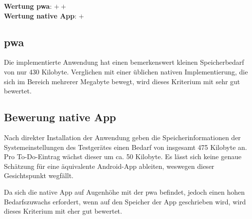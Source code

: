\textbf{Wertung \ac{pwa}}: $++$ \\
\textbf{Wertung native App}: $+$ \\

\subsection{\ac{pwa}}
Die implementierte Anwendung hat einen bemerkenswert kleinen Speicherbedarf von  nur 430 Kilobyte. Verglichen mit einer üblichen nativen Implementierung, die sich im Bereich mehrerer Megabyte bewegt, wird dieses Kriterium mit sehr gut bewertet.

\subsection{Bewerung native App}
Nach direkter Installation der Anwendung geben die Speicherinformationen der Systemeinstellungen des Testgerätes einen Bedarf von insgesamt 475 Kilobyte an. Pro To-Do-Eintrag wächst dieser um ca. 50 Kilobyte. Es lässt sich keine genaue Schätzung für eine äquivalente Android-App ableiten, weswegen dieser Gesichtspunkt wegfällt.

Da sich die native App auf Augenhöhe mit der \ac{pwa} befindet, jedoch einen hohen Bedarfszuwachs erfordert, wenn auf den Speicher der App geschrieben wird, wird dieses Kriterium mit eher gut bewertet.